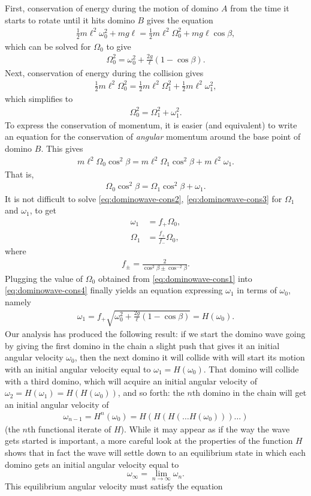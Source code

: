 \documentclass[12pt]{amsart}
\newcommand{\eq}[1]{\begin{equation}\begin{split}#1\end{split}\end{equation}}
\newcommand{\eqst}[1]{\begin{align*}#1\end{align*}}
\begin{document}
First, conservation of energy during the motion of domino $A$ from the time it starts to rotate until it hits domino $B$ gives the equation
\eqst{
\tfrac12 m \ell^2 \omega_0^2 + mg\ell = \tfrac12 m \ell^2 \Omega_0^2 + mg\ell \cos \beta,
}
which can be solved for $\Omega_0$ to give
\eq{ \label{eq:dominowave-cons1}
\Omega_0^2 = \omega_0^2 + \frac{2g}{\ell}(1-\cos \beta).
}
Next, conservation of energy during the collision gives
\eqst{
\tfrac12 m\ell^2 \Omega_0^2 = \tfrac12 m\ell^2 \Omega_1^2 + \tfrac12m\ell^2 \omega_1^2,
}
which simplifies to
\eq{ \label{eq:dominowave-cons2}
\Omega_0^2 = \Omega_1^2 + \omega_1^2.
}
To express the conservation of momentum, it is easier (and equivalent) to write an equation for the conservation of \emph{angular} momentum around the base point of domino $B$. This gives
\eqst{
m\ell^2\Omega_0 \cos^2\beta = m\ell^2\Omega_1 \cos^2 \beta + m\ell^2\omega_1.
}
That is,
\eq{ \label{eq:dominowave-cons3}
\Omega_0\cos^2\beta = \Omega_1\cos^2\beta + \omega_1.
}
It is not difficult to solve \eqref{eq:dominowave-cons2}, \eqref{eq:dominowave-cons3} for $\Omega_1$ and $\omega_1$, to get
\eq{ \label{eq:dominowave-cons4}
\omega_1 &= f_+ \Omega_0, \\
\Omega_1 &= \frac{f_+}{f_-} \Omega_0,
}
where
\eqst{
f_{\pm} = \frac{2}{\cos^2 \beta \pm \cos^{-2}\beta}.
}
Plugging the value of $\Omega_0$ obtained from \eqref{eq:dominowave-cons1} into \eqref{eq:dominowave-cons4} finally yields an equation expressing $\omega_1$ in terms of $\omega_0$, namely
\eqst{
\omega_1 = f_+ \sqrt{\omega_0^2 + \frac{2g}{\ell}(1-\cos \beta)} = H(\omega_0).
}
Our analysis has produced the following result: if we start the domino wave going by giving the first domino in the chain a slight push that gives it an initial angular velocity $\omega_0$, then the next domino it will collide with will start its motion with an initial angular velocity equal to $\omega_1=H(\omega_0)$. That domino will collide with a third domino, which will acquire an initial angular velocity of $\omega_2=H(\omega_1)=H(H(\omega_0))$, and so forth: the $n$th domino in the chain will get an initial angular velocity of
\eqst{ \omega_{n-1} = H^{n}(\omega_0) = H(H(H(\ldots H(\omega_0)))\ldots) }
(the $n$th functional iterate of $H$). While it may appear as if the way the wave gets started is important, a more careful look at the properties of the function $H$ shows that in fact the wave will settle down to an equilibrium state in which each domino gets an initial angular velocity equal to
$$ \omega_\infty = \lim_{n\to\infty} \omega_n. 
$$
This equilibrium angular velocity must satisfy the equation
\end{document}
